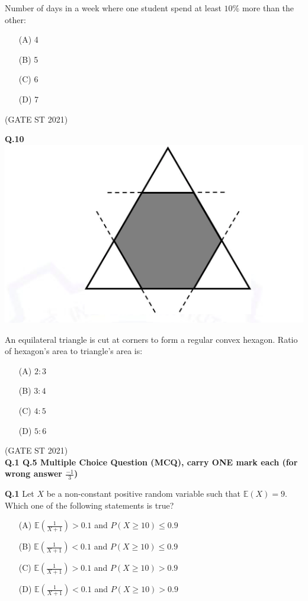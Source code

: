\documentclass[journal,12pt,onecolumn]{IEEEtran}
\theoremstyle{remark}
\begin{document}
Number of days in a week where one student spend at least $10\%$ more than the other:

\begin{enumerate}
\item[(A)] 4
\item[(B)] 5
\item[(C)] 6
\item[(D)] 7
\end{enumerate}

\hfill (GATE ST 2021) \\
\newpage


\textbf{Q.10} \\    \includegraphics[width=0.4\linewidth]{figs/5.png} 

An equilateral triangle is cut at corners to form a regular convex hexagon.  
Ratio of hexagon's area to triangle's area is:

\begin{enumerate}
\item[(A)] $2:3$
\item[(B)] $3:4$
\item[(C)] $4:5$
\item[(D)] $5:6$
\end{enumerate}

\hfill (GATE ST 2021) \\


\textbf{Q.1 \text{-} Q.5 Multiple Choice Question (MCQ), carry ONE mark each (for wrong answer $\frac{-1}{3}$)}


\textbf{Q.1}
Let $X$ be a non-constant positive random variable such that $\mathbb{E}(X) = 9$.  
Which one of the following statements is true?

\begin{enumerate}
\item[(A)] $\mathbb{E}\left( \frac{1}{X+1} \right) > 0.1$ and $P(X \geq 10) \leq 0.9$
\item[(B)] $\mathbb{E}\left( \frac{1}{X+1} \right) < 0.1$ and $P(X \geq 10) \leq 0.9$
\item[(C)] $\mathbb{E}\left( \frac{1}{X+1} \right) > 0.1$ and $P(X \geq 10) > 0.9$
\item[(D)] $\mathbb{E}\left( \frac{1}{X+1} \right) < 0.1$ and $P(X \geq 10) > 0.9$
\end{enumerate}
\end{document}
